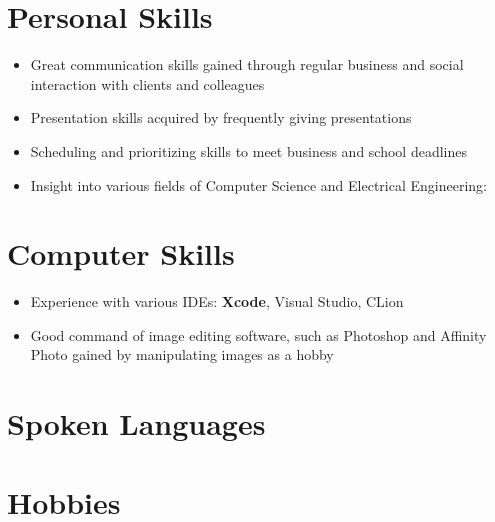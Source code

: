 \documentclass[11pt, a4paper, sans]{moderncv}
\begin{document}
\section{Personal Skills}
\begin{itemize}
	\item Great communication skills gained through regular business and social interaction with clients and colleagues
	\item Presentation skills acquired by frequently giving presentations
	\item Scheduling and prioritizing skills to meet business and school deadlines
	\item Insight into various fields of Computer Science and Electrical Engineering:
\end{itemize}

\section{Computer Skills}
\begin{itemize}
	\item Experience with various IDEs: \textbf{Xcode}, Visual Studio, CLion 
	\item Good command of image editing software, such as Photoshop and Affinity Photo gained by manipulating images as a hobby
\end{itemize}


\section{Spoken Languages}

\section{Hobbies}
\end{document}
